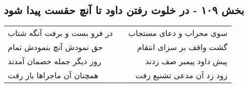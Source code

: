 \begin{center}
\section*{بخش ۱۰۹ - در خلوت رفتن داود تا آنچ حقست پیدا شود}
\label{sec:sh109}
\begin{longtable}{l p{0.5cm} r}
در فرو بست و برفت آنگه شتاب
&&
سوی محراب و دعای مستجاب
\\
حق نمودش آنچ بنمودش تمام
&&
گشت واقف بر سزای انتقام
\\
روز دیگر جمله خصمان آمدند
&&
پیش داود پیمبر صف زدند
\\
همچنان آن ماجراها باز رفت
&&
زود زد آن مدعی تشنیع زفت
\\
\end{longtable}
\end{center}
